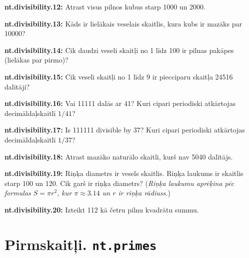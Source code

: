 \documentclass[11pt]{article}
\newenvironment{uzdevums}[1][\unskip]{%
\vspace{3mm}
\noindent
\textbf{#1:}
\noindent}
{}
\begin{document}
\begin{uzdevums}[nt.divisibility.12]
Atrast visus pilnos kubus starp 1000 un 2000. 
\end{uzdevums}

\begin{uzdevums}[nt.divisibility.13]
Kāds ir lielākais veselais skaitlis, kura kubs ir mazāks par 10000? 
\end{uzdevums}

\begin{uzdevums}[nt.divisibility.14]
Cik daudzi veseli skaitļi no 1 līdz 100 ir pilnas pakāpes (lielākas par pirmo)?
\end{uzdevums}

\begin{uzdevums}[nt.divisibility.15]
Cik veseli skaitļi no 1 līdz 9 ir piecciparu skaitļa 24516 dalītāji? 
\end{uzdevums}

\begin{uzdevums}[nt.divisibility.16]
Vai 11111 dalās ar 41? 
Kuri cipari periodiski atkārtojas decimāldaļskaitlī $1/41$? 
\end{uzdevums}

\begin{uzdevums}[nt.divisibility.17]
Is 111111 divisible by 37? Kuri cipari periodiski atkārtojas decimāldaļskaitlī $1/37$? 
\end{uzdevums}

\begin{uzdevums}[nt.divisibility.18]
Atrast mazāko naturālo skaitli, kurš nav 5040 dalītājs. 
\end{uzdevums}

\begin{uzdevums}[nt.divisibility.19]
Riņķa diametrs ir vesels skaitlis. Riņķa laukums ir skaitlis starp 100 un 120. 
Cik garš ir riņķa diametrs?
({\em Riņķa laukumu aprēķina pēc formulas $S = \pi r^2$, 
kur $\pi \approx 3.14$ un $r$ ir riņķa rādiuss.})
\end{uzdevums}

\begin{uzdevums}[nt.divisibility.20]
Izteikt 112 kā četru pilnu kvadrātu summu. 
\end{uzdevums}






\section{Pirmskaitļi. \texttt{nt.primes}}
\end{document}
